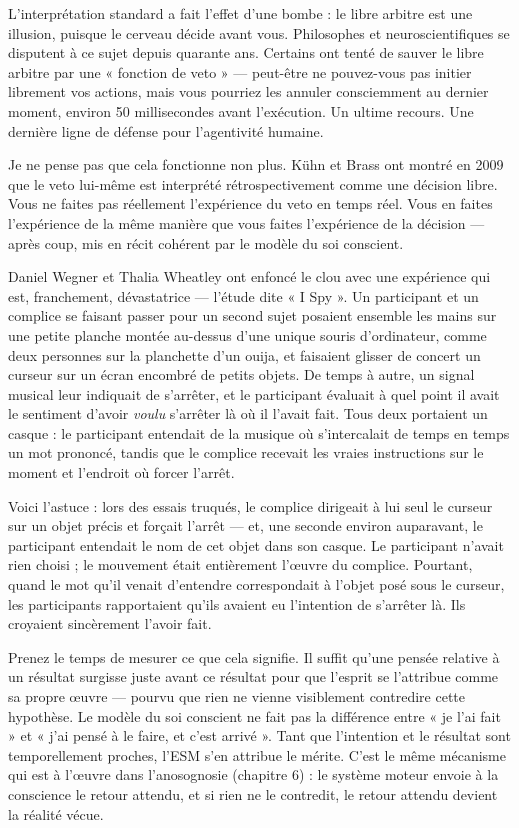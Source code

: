 \documentclass[11pt, twoside, openright]{book}
\begin{document}
L'interprétation standard a fait l'effet d'une bombe : le libre arbitre est une illusion, puisque le cerveau décide avant vous. Philosophes et neuroscientifiques se disputent à ce sujet depuis quarante ans. Certains ont tenté de sauver le libre arbitre par une « fonction de veto » --- peut-être ne pouvez-vous pas initier librement vos actions, mais vous pourriez les annuler consciemment au dernier moment, environ 50 millisecondes avant l'exécution. Un ultime recours. Une dernière ligne de défense pour l'agentivité humaine.

Je ne pense pas que cela fonctionne non plus. Kühn et Brass ont montré en 2009 que le veto lui-même est interprété rétrospectivement comme une décision libre. Vous ne faites pas réellement l'expérience du veto en temps réel. Vous en faites l'expérience de la même manière que vous faites l'expérience de la décision --- après coup, mis en récit cohérent par le modèle du soi conscient.

Daniel Wegner et Thalia Wheatley ont enfoncé le clou avec une expérience qui est, franchement, dévastatrice --- l'étude dite « I Spy ». Un participant et un complice se faisant passer pour un second sujet posaient ensemble les mains sur une petite planche montée au-dessus d'une unique souris d'ordinateur, comme deux personnes sur la planchette d'un ouija, et faisaient glisser de concert un curseur sur un écran encombré de petits objets. De temps à autre, un signal musical leur indiquait de s'arrêter, et le participant évaluait à quel point il avait le sentiment d'avoir \textit{voulu} s'arrêter là où il l'avait fait. Tous deux portaient un casque : le participant entendait de la musique où s'intercalait de temps en temps un mot prononcé, tandis que le complice recevait les vraies instructions sur le moment et l'endroit où forcer l'arrêt.

Voici l'astuce : lors des essais truqués, le complice dirigeait à lui seul le curseur sur un objet précis et forçait l'arrêt --- et, une seconde environ auparavant, le participant entendait le nom de cet objet dans son casque. Le participant n'avait rien choisi ; le mouvement était entièrement l'œuvre du complice. Pourtant, quand le mot qu'il venait d'entendre correspondait à l'objet posé sous le curseur, les participants rapportaient qu'ils avaient eu l'intention de s'arrêter là. Ils croyaient sincèrement l'avoir fait.

Prenez le temps de mesurer ce que cela signifie. Il suffit qu'une pensée relative à un résultat surgisse juste avant ce résultat pour que l'esprit se l'attribue comme sa propre œuvre --- pourvu que rien ne vienne visiblement contredire cette hypothèse. Le modèle du soi conscient ne fait pas la différence entre « je l'ai fait » et « j'ai pensé à le faire, et c'est arrivé ». Tant que l'intention et le résultat sont temporellement proches, l'ESM s'en attribue le mérite. C'est le même mécanisme qui est à l'œuvre dans l'anosognosie (chapitre 6) : le système moteur envoie à la conscience le retour attendu, et si rien ne le contredit, le retour attendu devient la réalité vécue.
\end{document}
